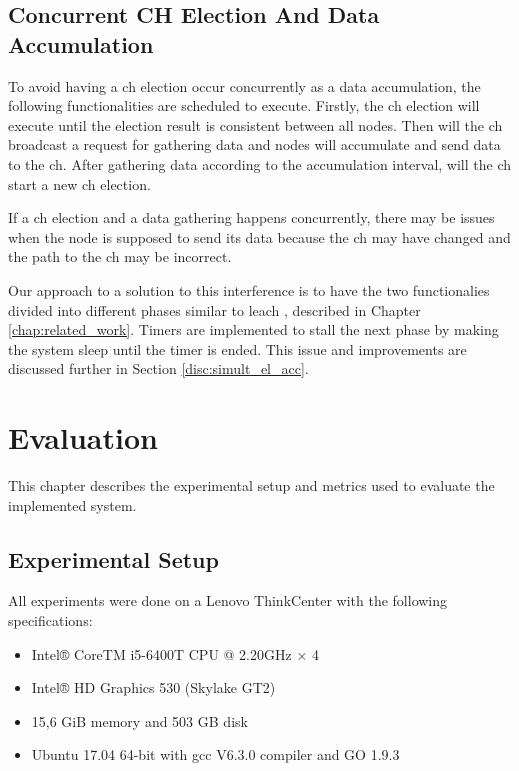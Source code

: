 \documentclass[USenglish]{uit-thesis}
\begin{document}
\newpage

\section{Concurrent CH Election And Data Accumulation} \label{sec:conc_events}
To avoid having a \gls{ch} election occur concurrently as a data accumulation, the following functionalities are scheduled to execute.
Firstly, the \gls{ch} election will execute until the election result is consistent between all nodes. Then will the \gls{ch} broadcast a request for gathering data and nodes will accumulate and send data to the \gls{ch}. After gathering data according to the accumulation interval, will the \gls{ch} start a new \gls{ch} election. 

If a \gls{ch} election and a data gathering happens concurrently, there may be issues when the node is supposed to send its data because the \gls{ch} may have changed and the path to the \gls{ch} may be incorrect. 

Our approach to a solution to this interference is to have the two functionalies divided into different phases similar to \gls{leach} \cite{leach}, described in Chapter \ref{chap:related_work}. Timers are implemented to stall the next phase by making the system sleep until the timer is ended. This issue and improvements are discussed further in Section \ref{disc:simult_el_acc}.







\chapter{Evaluation}
This chapter describes the experimental setup and metrics used to evaluate the implemented system.

\section{Experimental Setup}
All experiments were done on a Lenovo ThinkCenter with the following specifications:

\begin{itemize} 
\item Intel® CoreTM i5-6400T CPU @ 2.20GHz × 4
\item Intel® HD Graphics 530 (Skylake GT2)
\item 15,6 GiB memory and 503 GB disk
\item Ubuntu 17.04 64-bit with gcc V6.3.0 compiler and GO 1.9.3
\end{itemize}
\end{document}
